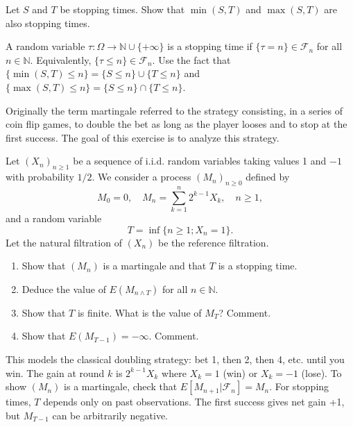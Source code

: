 \begin{exercise}
Let \(S\) and \(T\) be stopping times. Show that \(\min(S, T)\) and \(\max(S, T)\) are also stopping times.

\begin{reminder}
A random variable \(\tau: \Omega \to \mathbb{N} \cup \{+\infty\}\) is a stopping time if \(\{\tau = n\} \in \mathcal{F}_n\) for all \(n \in \mathbb{N}\). Equivalently, \(\{\tau \leq n\} \in \mathcal{F}_n\). Use the fact that \(\{\min(S,T) \leq n\} = \{S \leq n\} \cup \{T \leq n\}\) and \(\{\max(S,T) \leq n\} = \{S \leq n\} \cap \{T \leq n\}\).
\end{reminder}
\end{exercise}

\begin{exercise}
Originally the term martingale referred to the strategy consisting, in a series of coin flip games, to double the bet as long as the player looses and to stop at the first success. The goal of this exercise is to analyze this strategy.

Let \((X_n)_{n \geq 1}\) be a sequence of i.i.d. random variables taking values 1 and \(-1\) with probability \(1/2\). We consider a process \((M_n)_{n \geq 0}\) defined by
\[M_0 = 0, \quad M_n = \sum_{k=1}^n 2^{k-1}X_k, \quad n \geq 1,\]
and a random variable
\[T = \inf\{n \geq 1; X_n = 1\}.\]
Let the natural filtration of \((X_n)\) be the reference filtration.
\begin{enumerate}
    \item Show that \((M_n)\) is a martingale and that \(T\) is a stopping time.
    \item Deduce the value of \(E(M_{n \wedge T})\) for all \(n \in \mathbb{N}\).
    \item Show that \(T\) is finite. What is the value of \(M_T\)? Comment.
    \item Show that \(E(M_{T-1}) = -\infty\). Comment.
\end{enumerate}

\begin{reminder}
This models the classical doubling strategy: bet 1, then 2, then 4, etc. until you win. The gain at round \(k\) is \(2^{k-1}X_k\) where \(X_k = 1\) (win) or \(X_k = -1\) (lose). To show \((M_n)\) is a martingale, check that \(E[M_{n+1}|\mathcal{F}_n] = M_n\). 
For stopping times, \(T\) depends only on past observations. The first success gives net gain +1, but \(M_{T-1}\) can be arbitrarily negative.
\end{reminder}
\end{exercise}

